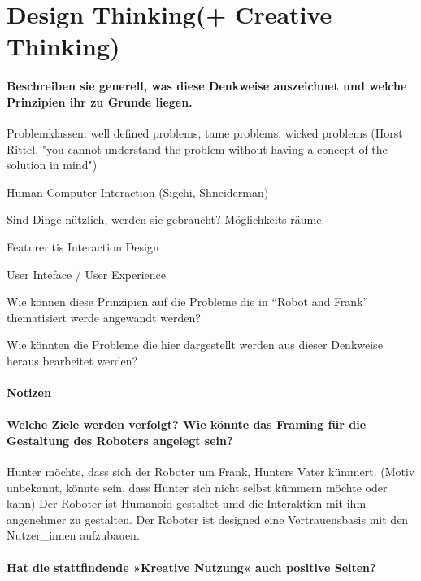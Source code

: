 \documentclass[sigchi-a, authorversion]{acmart}
\begin{document}
\section{Design Thinking(+ Creative Thinking)}

\paragraph{Beschreiben sie generell, was diese Denkweise auszeichnet und welche Prinzipien ihr zu Grunde liegen.}

Problemklassen:
	well defined problems,
	tame problems,
	wicked problems (Horst Rittel, "you cannot understand the problem without having a concept of the solution in mind")

Human-Computer Interaction (Sigchi, Shneiderman)

Sind Dinge nützlich, werden sie gebraucht? Möglichkeits räume.

Featureritis
Interaction Design

User Inteface / User Experience

Wie können diese Prinzipien auf die Probleme die in ``Robot and Frank'' thematisiert werde angewandt werden?

Wie könnten die Probleme die hier dargestellt werden aus dieser Denkweise heraus bearbeitet werden?

\paragraph{Notizen}

\paragraph{Welche Ziele werden verfolgt? Wie könnte das Framing für die Gestaltung des Roboters angelegt sein?}

Hunter möchte, dass sich der Roboter um Frank, Hunters Vater kümmert. (Motiv unbekannt, könnte sein, dass Hunter sich nicht selbst kümmern möchte oder kann)
Der Roboter ist Humanoid gestaltet umd die Interaktion mit ihm angenehmer zu gestalten.
Der Roboter ist designed eine Vertrauensbasis mit den Nutzer\_innen aufzubauen.

\paragraph{Hat die stattfindende »Kreative Nutzung« auch positive Seiten?}
\end{document}
